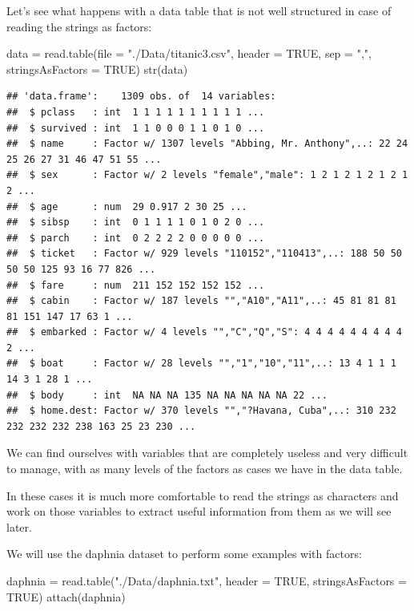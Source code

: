 \documentclass[
]{book}
\newenvironment{Shaded}{\begin{snugshade}}{\end{snugshade}}
\newcommand{\AttributeTok}[1]{\textcolor[rgb]{0.77,0.63,0.00}{#1}}
\newcommand{\ConstantTok}[1]{\textcolor[rgb]{0.00,0.00,0.00}{#1}}
\newcommand{\FunctionTok}[1]{\textcolor[rgb]{0.00,0.00,0.00}{#1}}
\newcommand{\NormalTok}[1]{#1}
\newcommand{\OtherTok}[1]{\textcolor[rgb]{0.56,0.35,0.01}{#1}}
\newcommand{\StringTok}[1]{\textcolor[rgb]{0.31,0.60,0.02}{#1}}
\begin{document}
Let's see what happens with a data table that is not well structured in case of reading the strings as factors:

\begin{Shaded}
\begin{Highlighting}[]
\NormalTok{data }\OtherTok{=} \FunctionTok{read.table}\NormalTok{(}\AttributeTok{file =} \StringTok{"./Data/titanic3.csv"}\NormalTok{, }\AttributeTok{header =} \ConstantTok{TRUE}\NormalTok{, }\AttributeTok{sep =} \StringTok{","}\NormalTok{, }\AttributeTok{stringsAsFactors =} \ConstantTok{TRUE}\NormalTok{)}
\FunctionTok{str}\NormalTok{(data)}
\end{Highlighting}
\end{Shaded}

\begin{verbatim}
## 'data.frame':    1309 obs. of  14 variables:
##  $ pclass   : int  1 1 1 1 1 1 1 1 1 1 ...
##  $ survived : int  1 1 0 0 0 1 1 0 1 0 ...
##  $ name     : Factor w/ 1307 levels "Abbing, Mr. Anthony",..: 22 24 25 26 27 31 46 47 51 55 ...
##  $ sex      : Factor w/ 2 levels "female","male": 1 2 1 2 1 2 1 2 1 2 ...
##  $ age      : num  29 0.917 2 30 25 ...
##  $ sibsp    : int  0 1 1 1 1 0 1 0 2 0 ...
##  $ parch    : int  0 2 2 2 2 0 0 0 0 0 ...
##  $ ticket   : Factor w/ 929 levels "110152","110413",..: 188 50 50 50 50 125 93 16 77 826 ...
##  $ fare     : num  211 152 152 152 152 ...
##  $ cabin    : Factor w/ 187 levels "","A10","A11",..: 45 81 81 81 81 151 147 17 63 1 ...
##  $ embarked : Factor w/ 4 levels "","C","Q","S": 4 4 4 4 4 4 4 4 4 2 ...
##  $ boat     : Factor w/ 28 levels "","1","10","11",..: 13 4 1 1 1 14 3 1 28 1 ...
##  $ body     : int  NA NA NA 135 NA NA NA NA NA 22 ...
##  $ home.dest: Factor w/ 370 levels "","?Havana, Cuba",..: 310 232 232 232 232 238 163 25 23 230 ...
\end{verbatim}

We can find ourselves with variables that are completely useless and very difficult to manage, with as many levels of the factors as cases we have in the data table.

In these cases it is much more comfortable to read the strings as characters and work on those variables to extract useful information from them as we will see later.

We will use the daphnia dataset to perform some examples with factors:

\begin{Shaded}
\begin{Highlighting}[]
\NormalTok{daphnia }\OtherTok{=} \FunctionTok{read.table}\NormalTok{(}\StringTok{"./Data/daphnia.txt"}\NormalTok{, }\AttributeTok{header =} \ConstantTok{TRUE}\NormalTok{, }\AttributeTok{stringsAsFactors =} \ConstantTok{TRUE}\NormalTok{)}
\FunctionTok{attach}\NormalTok{(daphnia)}
\end{Highlighting}
\end{Shaded}
\end{document}
